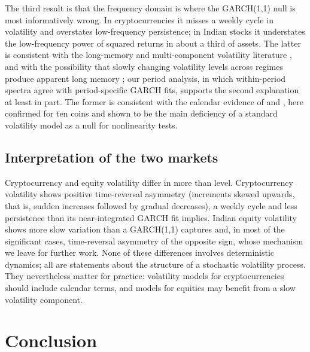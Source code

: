 \documentclass[11pt,a4paper]{article}
\begin{document}
The third result is that the frequency domain is where the GARCH(1,1) null is most informatively wrong. In
cryptocurrencies it misses a weekly cycle in volatility and overstates low-frequency persistence; in Indian stocks it
understates the low-frequency power of squared returns in about a third of assets. The latter is consistent with the
long-memory and multi-component volatility literature \citep{DingGrangerEngle1993,Baillie1996,Corsi2009}, and with the
possibility that slowly changing volatility levels across regimes produce apparent long memory
\citep{LamoureuxLastrapes1990,MikoschStarica2004}; our period analysis, in which within-period spectra agree with
period-specific GARCH fits, supports the second explanation at least in part. The former is consistent with the
calendar evidence of \citet{Baur2019} and \citet{AharonQadan2019}, here confirmed for ten coins and shown to be the
main deficiency of a standard volatility model as a null for nonlinearity tests.

\subsection{Interpretation of the two markets}

Cryptocurrency and equity volatility differ in more than level. Cryptocurrency volatility shows positive time-reversal
asymmetry (increments skewed upwards, that is, sudden increases followed by gradual decreases), a weekly cycle and
less persistence than its near-integrated GARCH fit implies. Indian equity volatility shows more slow variation than a
GARCH(1,1) captures and, in most of the significant cases, time-reversal asymmetry of the opposite sign, whose
mechanism we leave for further work. None of these
differences involves deterministic dynamics; all are statements about the structure of a stochastic volatility process.
They nevertheless matter for practice: volatility models for cryptocurrencies should include calendar terms, and
models for equities may benefit from a slow volatility component.

\section{Conclusion}\label{sec:conclusion}
\end{document}

